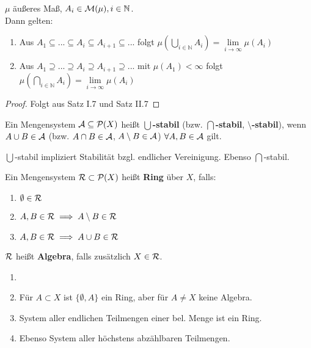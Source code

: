   \begin{lemma}
    $\mu$ äußeres Maß, $A_i \in \mathcal{M}(\mu), i \in \mathbb{N}$.\\
    Dann gelten:
    \begin{enumerate}[label=\roman*)]
      \item Aus $A_1 \subseteq ... \subseteq A_i \subseteq A_{i+1} \subseteq ...$ folgt $\mu(\bigcup\limits_{i \in \mathbb{N}} A_i) = \lim\limits_{i \to \infty} \mu(A_i)$
      \item Aus $A_1 \supseteq ... \supseteq A_i \supseteq A_{i+1} \supseteq ...$ mit $\mu(A_1) < \infty$ folgt $\mu(\bigcap\limits_{i \in \mathbb{N}} A_i) = \lim\limits_{i \to \infty} \mu(A_i)$
    \end{enumerate} 
  \end{lemma}
  
  \begin{proof}
    Folgt aus Satz I.7 und Satz II.7
  \end{proof}

  \begin{definition}
    Ein Mengensystem $\mathcal{A} \subseteq \mathcal{P}(X)$ heißt $\bm{\bigcup}$\textbf{-stabil} (bzw. $\bm{\bigcap}$\textbf{-stabil}, $\bm{\setminus}$\textbf{-stabil}), wenn $A \cup B \in \mathcal{A}$ (bzw. $A \cap B \in \mathcal{A}$, $A \setminus B \in \mathcal{A}$) $\forall A,B \in \mathcal{A}$ gilt.
  \end{definition}

  \begin{remark}
    $\bigcup$-stabil impliziert Stabilität bzgl. endlicher Vereinigung. Ebenso $\bigcap$-stabil.
  \end{remark}

  \begin{definition}
    Ein Mengensystem $\mathcal{R}\subset\mathcal{P}(X)$ heißt \textbf{Ring} über $X$, falls:
    \begin{enumerate}[label=\roman*)]
      \item $\emptyset \in \mathcal{R}$
      \item $A,B \in \mathcal{R} \implies A \setminus B \in \mathcal{R}$
      \item $A,B \in \mathcal{R} \implies A \cup B \in \mathcal{R}$
    \end{enumerate}
    
    $\mathcal{R}$ heißt \textbf{Algebra}, falls zusätzlich $X \in \mathcal{R}$.
  \end{definition}

  \begin{example}
    \begin{enumerate}[label=\roman*)]
      \item[]
      \item Für $A \subset X$ ist $\{\emptyset, A\}$ ein Ring, aber für $A \neq X$ keine Algebra.
      \item System aller endlichen Teilmengen einer bel. Menge ist ein Ring.
      \item Ebenso System aller höchstens abzählbaren Teilmengen. 
    \end{enumerate}
  \end{example}

